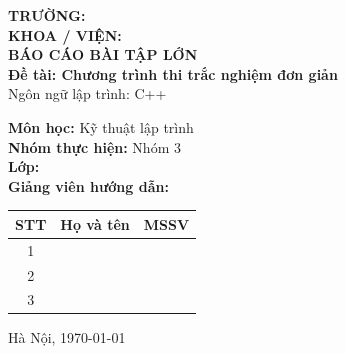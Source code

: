\documentclass[12pt,a4paper]{article}
\begin{document}

\begin{titlepage}
    \centering
    {\Large \textbf{TRƯỜNG: \underline{\hspace{8cm}}}}\\[0.5cm]
    {\Large \textbf{KHOA / VIỆN: \underline{\hspace{7cm}}}}\\[3cm]

    {\LARGE \textbf{BÁO CÁO BÀI TẬP LỚN}}\\[0.5cm]
    {\Large \textbf{Đề tài: Chương trình thi trắc nghiệm đơn giản}}\\[0.5cm]
    {\large Ngôn ngữ lập trình: C++}\\[3cm]

    \begin{flushleft}
        \textbf{Môn học:} Kỹ thuật lập trình\\[0.3cm]
        \textbf{Nhóm thực hiện:} Nhóm 3\\[0.3cm]
        \textbf{Lớp:} \underline{\hspace{6cm}}\\[0.3cm]
        \textbf{Giảng viên hướng dẫn:} \underline{\hspace{6cm}}\\[0.8cm]
    \end{flushleft}

    \begin{center}
    \begin{tabular}{|c|p{6cm}|p{5cm}|}
        \hline
        \textbf{STT} & \textbf{Họ và tên} & \textbf{MSSV} \\
        \hline
        1 & \underline{\hspace{5.5cm}} & \underline{\hspace{4.5cm}} \\
        \hline
        2 & \underline{\hspace{5.5cm}} & \underline{\hspace{4.5cm}} \\
        \hline
        3 & \underline{\hspace{5.5cm}} & \underline{\hspace{4.5cm}} \\
        \hline
    \end{tabular}
    \end{center}

    \vfill
    {\large Hà Nội, \today}
\end{titlepage}
\end{document}
